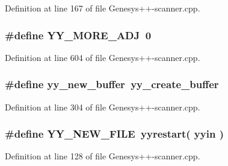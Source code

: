 Definition at line 167 of file Genesys++-\/scanner.\-cpp.

\hypertarget{_genesys_09_09-scanner_8cpp_a68792d73820bc46a71d3d4e613f0b977}{
\subsubsection[{Y\-Y\-\_\-\-M\-O\-R\-E\-\_\-\-A\-D\-J}]{\setlength{\rightskip}{0pt plus 5cm}\#define Y\-Y\-\_\-\-M\-O\-R\-E\-\_\-\-A\-D\-J~0}}\label{_genesys_09_09-scanner_8cpp_a68792d73820bc46a71d3d4e613f0b977}


Definition at line 604 of file Genesys++-\/scanner.\-cpp.

\hypertarget{_genesys_09_09-scanner_8cpp_ab7eb911e18655f2f78e63afe5a8a4a12}{
\subsubsection[{yy\-\_\-new\-\_\-buffer}]{\setlength{\rightskip}{0pt plus 5cm}\#define yy\-\_\-new\-\_\-buffer~{\bf yy\-\_\-create\-\_\-buffer}}}\label{_genesys_09_09-scanner_8cpp_ab7eb911e18655f2f78e63afe5a8a4a12}


Definition at line 304 of file Genesys++-\/scanner.\-cpp.

\hypertarget{_genesys_09_09-scanner_8cpp_a0406739e64fb5750cf995d2ae68ce69d}{
\subsubsection[{Y\-Y\-\_\-\-N\-E\-W\-\_\-\-F\-I\-L\-E}]{\setlength{\rightskip}{0pt plus 5cm}\#define Y\-Y\-\_\-\-N\-E\-W\-\_\-\-F\-I\-L\-E~{\bf yyrestart}( {\bf yyin}  )}}\label{_genesys_09_09-scanner_8cpp_a0406739e64fb5750cf995d2ae68ce69d}


Definition at line 128 of file Genesys++-\/scanner.\-cpp.

